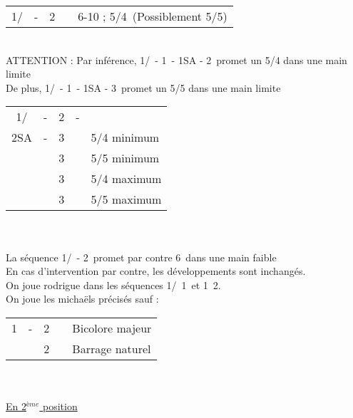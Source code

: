 \documentclass[a4paper, oneside, 11pt]{report}
\begin{document}
		\begin{tabular}{cccc|l}
		1\trefle/\carreau & - & 2\coeur && 6-10 ; 5\pique/4\coeur\ (Possiblement 5/5)\\
		\end{tabular}\\
		ATTENTION : Par inférence, 1\trefle/\carreau\ - 1\pique\ - 1SA - 2\coeur\ promet un 5/4 dans une main limite\\
		De plus, 1\trefle/\carreau\ - 1\pique\ - 1SA - 3\coeur\ promet un 5/5 dans une main limite\\
	
		\begin{tabular}{cccc|l}
		1\trefle/\carreau & - & 2\coeur & - &\\
		2SA & - & 3\trefle && 5/4 minimum\\
		&& 3\carreau && 5/5 minimum\\
		&& 3\coeur && 5/4 maximum\\
		&& 3\pique && 5/5 maximum\\
		\end{tabular}\\\\
	
		La séquence 1\trefle/\carreau\ - 2\pique\ promet par contre 6\pique\ dans une main faible\\
		
		En cas d'intervention par contre, les développements sont inchangés.\\
		
		On joue rodrigue dans les séquences 1\trefle/\carreau\ 1\pique\ et 1\carreau\ 2\trefle.\\
		
		\SSection{1\trefle\ 2\trefle\ \& 1\trefle\ 2\carreau}
		On joue les michaëls précisés sauf :\\
		
		\begin{tabular}{cccc|l}
		1\trefle & - & 2\trefle && Bicolore majeur\\
		&& 2\carreau && Barrage naturel\\
		\end{tabular}\\\\

	\underline{En 2$^{ème}$ position}
	
\end{document}
